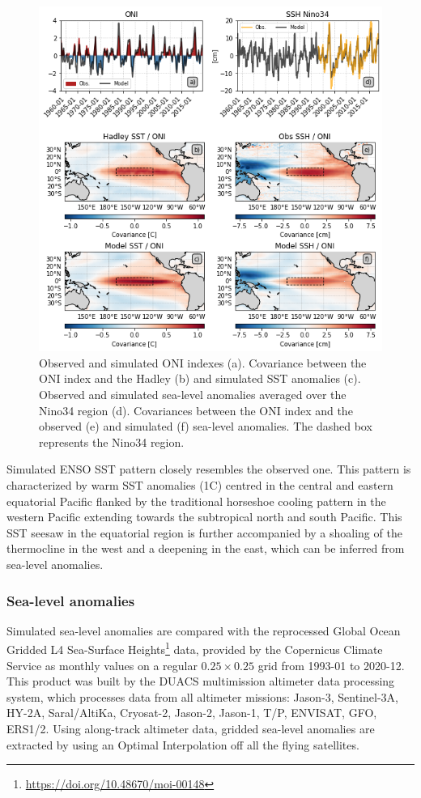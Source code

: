\begin{figure}[htp]
	\centering
	\includegraphics[scale=0.6]{figs/fig1.png}
	\caption{Observed and simulated ONI indexes (a). Covariance between the ONI index and the Hadley (b) and simulated SST anomalies (c). Observed and simulated sea-level anomalies averaged over the Nino34 region (d). Covariances between the ONI index and the observed (e) and simulated (f) sea-level anomalies. The dashed box represents the Nino34 region.}
	\label{fig:nemo-had-sst}
\end{figure}

Simulated ENSO SST  pattern closely resembles the observed one. This pattern is characterized by warm SST anomalies (1\degree{}C) centred in the central and eastern equatorial Pacific  flanked by the traditional horseshoe cooling pattern in the western Pacific extending towards the subtropical north and south Pacific. This SST seesaw in the equatorial region is further accompanied by a shoaling of the thermocline in the west and a deepening in the east, which can be inferred from sea-level anomalies.

\subsubsection{Sea-level anomalies}

Simulated sea-level anomalies are compared with the reprocessed Global Ocean Gridded L4 Sea-Surface Heights\footnote{\url{https://doi.org/10.48670/moi-00148}} data, provided by the Copernicus Climate Service as monthly values on a regular $0.25 \times 0.25$ grid from 1993-01 to 2020-12. This product was built by the DUACS multimission altimeter data processing system, which processes data from all altimeter missions: Jason-3, Sentinel-3A, HY-2A, Saral/AltiKa, Cryosat-2, Jason-2, Jason-1, T/P, ENVISAT, GFO, ERS1/2. Using along-track altimeter data, gridded sea-level anomalies are extracted by using an Optimal Interpolation off all the flying satellites. 

